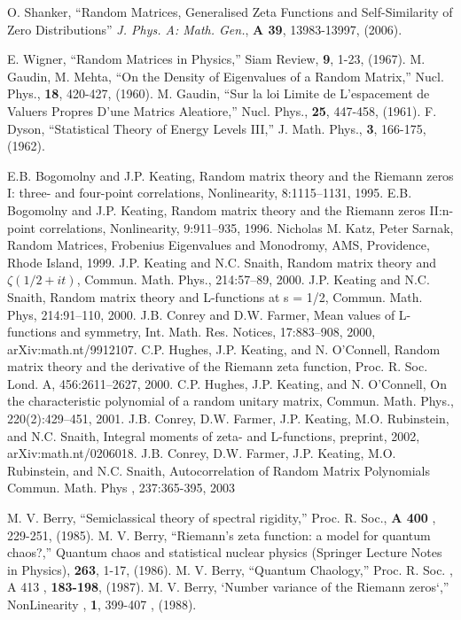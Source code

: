 \documentclass[twoside]{article}
\begin{document}

\begin{thebibliography}{10}

 O. Shanker, 
``Random Matrices, Generalised Zeta Functions and Self-Similarity of Zero Distributions''
{\it J. Phys. A: Math. Gen.}, {\bf A 39}, 13983-13997, (2006). 

 E. Wigner, “Random Matrices in Physics,” Siam Review, {\bf 9}, 1-23, (1967).
 M. Gaudin, M. Mehta, “On the Density of Eigenvalues of a Random Matrix,” 
Nucl. Phys., {\bf 18},
420-427, (1960).
 M. Gaudin, 
“Sur la loi Limite de L’espacement de Valuers Propres D’une Matrics Aleatiore,” 
Nucl. Phys., {\bf 25}, 447-458, (1961).
 F. Dyson, “Statistical Theory of Energy Levels III,” 
J. Math. Phys., {\bf 3}, 166-175, (1962).

 E.B. Bogomolny and J.P. Keating, Random matrix theory and the Riemann zeros I: three- and
four-point correlations, Nonlinearity, 8:1115–1131, 1995.
 E.B. Bogomolny and J.P. Keating, Random matrix theory and the Riemann zeros II:n-point
correlations, Nonlinearity, 9:911–935, 1996.
 Nicholas M. Katz, Peter Sarnak, Random Matrices, Frobenius Eigenvalues and Monodromy, AMS,
Providence, Rhode Island, 1999.
 J.P. Keating and N.C. Snaith, Random matrix theory and $\zeta(1/2 + it)$, 
Commun. Math. Phys., 214:57–89, 2000.
 J.P. Keating and N.C. Snaith, Random matrix theory and L-functions at s = 1/2, 
Commun.
Math. Phys, 214:91–110, 2000.
 J.B. Conrey and D.W. Farmer, Mean values of L-functions and symmetry, Int. Math. Res.
Notices, 17:883–908, 2000, arXiv:math.nt/9912107.
 C.P. Hughes, J.P. Keating, and N. O’Connell, Random matrix theory and the derivative of the
Riemann zeta function, Proc. R. Soc. Lond. A, 456:2611–2627, 2000.
 C.P. Hughes, J.P. Keating, and N. O’Connell, On the characteristic polynomial of a random
unitary matrix, Commun. Math. Phys., 220(2):429–451, 2001.
 J.B. Conrey, D.W. Farmer, J.P. Keating, M.O. Rubinstein, and N.C. Snaith, Integral moments
of zeta- and L-functions, preprint, 2002, arXiv:math.nt/0206018.
 J.B. Conrey, D.W. Farmer, J.P. Keating, M.O. Rubinstein, and N.C. Snaith, Autocorrelation of
Random Matrix Polynomials Commun. Math. Phys , 237:365-395, 2003

  M. V. Berry, “Semiclassical theory of spectral rigidity,” 
Proc. R. Soc., {\bf A 400} , 229-251, (1985). 
  M. V. Berry, “Riemann’s zeta function: a model for quantum chaos?,” 
Quantum chaos and
statistical nuclear physics (Springer Lecture Notes in Physics), {\bf 263}, 1-17, (1986).
  M. V. Berry, “Quantum Chaology,” 
Proc. R. Soc. , A 413 , {\bf 183-198}, (1987).
  M. V. Berry, ‘Number variance of the Riemann zeros‘,”
 NonLinearity , {\bf 1}, 399-407 , (1988).


\end{thebibliography}
\end{document}
